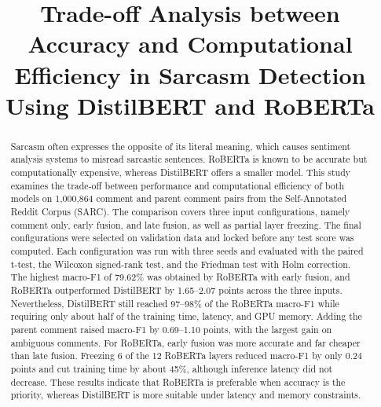 \documentclass[conference]{IEEEtran}
\begin{document}
\title{Trade-off Analysis between Accuracy and Computational Efficiency in Sarcasm Detection Using DistilBERT and RoBERTa}

\author{
\and
{}
}

\maketitle

\begin{abstract}
Sarcasm often expresses the opposite of its literal meaning, which causes sentiment analysis systems to misread sarcastic sentences. RoBERTa is known to be accurate but computationally expensive, whereas DistilBERT offers a smaller model. This study examines the trade-off between performance and computational efficiency of both models on 1,000,864 comment and parent comment pairs from the Self-Annotated Reddit Corpus (SARC). The comparison covers three input configurations, namely comment only, early fusion, and late fusion, as well as partial layer freezing. The final configurations were selected on validation data and locked before any test score was computed. Each configuration was run with three seeds and evaluated with the paired t-test, the Wilcoxon signed-rank test, and the Friedman test with Holm correction. The highest macro-F1 of 79.62\% was obtained by RoBERTa with early fusion, and RoBERTa outperformed DistilBERT by 1.65--2.07 points across the three inputs. Nevertheless, DistilBERT still reached 97--98\% of the RoBERTa macro-F1 while requiring only about half of the training time, latency, and GPU memory. Adding the parent comment raised macro-F1 by 0.69--1.10 points, with the largest gain on ambiguous comments. For RoBERTa, early fusion was more accurate and far cheaper than late fusion. Freezing 6 of the 12 RoBERTa layers reduced macro-F1 by only 0.24 points and cut training time by about 45\%, although inference latency did not decrease. These results indicate that RoBERTa is preferable when accuracy is the priority, whereas DistilBERT is more suitable under latency and memory constraints.
\end{abstract}
\end{document}
